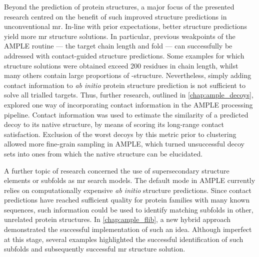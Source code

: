 Beyond the prediction of protein structures, a major focus of the presented research centred on the benefit of such improved structure predictions in unconventional \gls{mr}. In-line with prior expectations, better structure predictions yield more \gls{mr} structure solutions. In particular, previous weakpoints of the AMPLE routine --- the target chain length and fold --- can successfully be addressed with contact-guided structure predictions. Some examples for which structure solutions were obtained exceed 200 residues in chain length, whilst many others contain large proportions of \textbeta-structure. Nevertheless, simply adding contact information to \textit{ab initio} protein structure prediction is not sufficient to solve all trialled targets. Thus, further research, outlined in \cref{chap:ample_decoys}, explored one way of incorporating contact information in the AMPLE processing pipeline. Contact information was used to estimate the similarity of a predicted decoy to its native structure, by means of scoring its long-range contact satisfaction. Exclusion of the worst decoys by this metric prior to clustering allowed more fine-grain sampling in AMPLE, which turned unsuccessful decoy sets into ones from which the native structure can be elucidated.

A further topic of research concerned the use of supersecondary structure elements or subfolds as \gls{mr} search models. The default mode in AMPLE currently relies on computationally expensive \textit{ab initio} structure predictions. Since contact predictions have reached sufficient quality for protein families with many known sequences, such information could be used to identify matching subfolds in other, unrelated protein structures. In \cref{chap:ample_flib}, a new hybrid approach demonstrated the successful implementation of such an idea. Although imperfect at this stage, several examples highlighted the successful identification of such subfolds and subsequently successful \gls{mr} structure solution.

